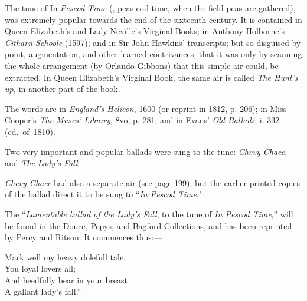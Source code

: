 
\smallskip



The tune of In \textit{Pescod Time} (\ie, peas-cod time, when the field peas are
gathered), was extremely popular towards the end of the sixteenth century. It is
contained in Queen Elizabeth’s and Lady Neville’s Virginal Books; in Anthony
Holborne’s \textit{Citharn Schoole} (1597); and in Sir John Hawkins’ transcripts; but
so disguised by point, augmentation, and other learned contrivances, that it was
only by scanning the whole arrangement (by Orlando Gibbons) that this simple
air could, be extracted. In Queen Elizabeth’s Virginal Book, the same air is
called \textit{The Hunt's up,} in another part of the book.

The words are in \textit{England's Helicon}, 1600 (or reprint in 1812, p. 206); in
Miss Cooper’s \textit{The Muses' Library}, 8vo, p. 281; and in Evans’ \textit{Old Ballads},
i. 332 (ed.~of~1810).

Two very important and popular ballads were sung to the tune: \textit{Chevy Chace},
and \textit{The Lady’s Fall}.

\textit{Chevy Chace} had also a separate air (see page 199); but the earlier printed
copies of the ballad direct it to be sung to “\textit{In Pescod Time}."
\pagebreak

The “\textit{Lamentable ballad of the Lady’s Fall}, to the tune of \textit{In Pescod Time},”
will be found in the Douce, Pepys, and Bagford Collections, and has been reprinted
by Percy and Ritson. It commences thus:—
\settowidth{\versewidth}{Mark well my heavy dolefull tale,}
\begin{scverse}
\begin{altverse}
Mark well my heavy dolefull tale,\\
You loyal lovers all;\\
And heedfully bear in your breast\\
A gallant lady’s fall.”
\end{altverse}
\end{scverse}

